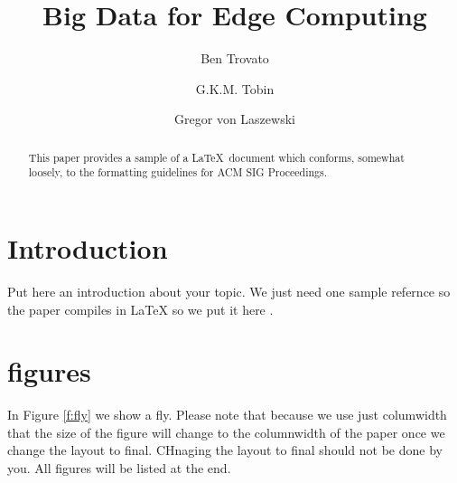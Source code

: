 \documentclass[sigconf]{acmart}
\begin{document}
\title{Big Data for Edge Computing}


\author{Ben Trovato}

\author{G.K.M. Tobin}

\author{Gregor von Laszewski}


\renewcommand{\shortauthors}{G. v. Laszewski}


\begin{abstract}
This paper provides a sample of a \LaTeX\ document which conforms,
somewhat loosely, to the formatting guidelines for
ACM SIG Proceedings.
\end{abstract}



\maketitle



\section{Introduction}

Put here an introduction about your topic. 
We just need one sample refernce so the paper compiles in LaTeX so we
put it here \cite{editor00}.

\section{figures}

In Figure \ref{f:fly} we show a fly. Please note that because we use
just columwidth that the size of the figure will change to the
columnwidth of the paper once we change the layout to final. CHnaging
the layout to final should not be done by you. All figures will be
listed at the end.
\end{document}
